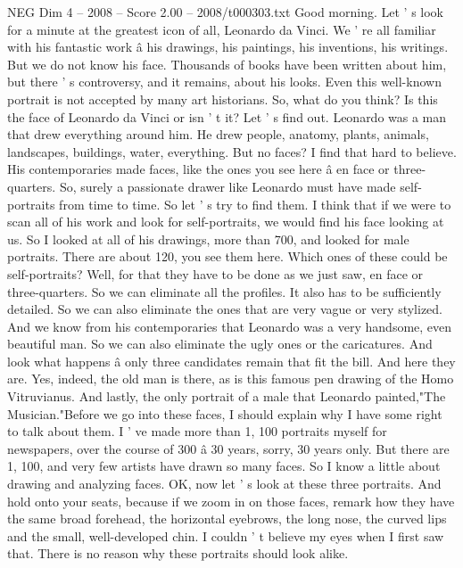 \begin{textsample}{NEG Dim 4 – 2008 – Score 2.00 – 2008/t000303.txt}  \label{ex:f4_neg_029}
Good morning.
Let ' s look for a minute at the greatest icon of all, Leonardo da Vinci.
We ' re all familiar with his fantastic work â his drawings, his paintings, his inventions, his writings.
But we do not know his face.
Thousands of books have been written about him, but there ' s controversy, and it remains, about his looks.
Even this well-known portrait is not accepted by many art historians.
So, what do you think?
Is this the face of Leonardo da Vinci or isn ' t it?
Let ' s find out.
Leonardo was a man that drew everything around him.
He drew people, anatomy, plants, animals, landscapes, buildings, water, everything.
But no faces?
I find that hard to believe.
His contemporaries made faces, like the ones you see here â en face or three-quarters.
So, surely a passionate drawer like Leonardo must have made self-portraits from time to time.
So let ' s try to find them.
I think that if we were to scan all of his work and look for self-portraits, we would find his face looking at us.
So I looked at all of his drawings, more than 700, and looked for male portraits.
There are about 120, you see them here.
Which ones of these could be self-portraits?
Well, for that they have to be done as we just saw, en face or three-quarters.
So we can eliminate all the profiles.
It also has to be sufficiently detailed.
So we can also eliminate the ones that are very vague or very stylized.
And we know from his contemporaries that Leonardo was a very handsome, even beautiful man.
So we can also eliminate the ugly ones or the caricatures.
And look what happens â only three candidates remain that fit the bill.
And here they are.
Yes, indeed, the old man is there, as is this famous pen drawing of the Homo Vitruvianus.
And lastly, the only portrait of a male that Leonardo painted,"The Musician."Before we go into these faces, I should explain why I have some right to talk about them.
I ' ve made more than 1, 100 portraits myself for newspapers, over the course of 300 â 30 years, sorry, 30 years only.
But there are 1, 100, and very few artists have drawn so many faces.
So I know a little about drawing and analyzing faces.
OK, now let ' s look at these three portraits.
And hold onto your seats, because if we zoom in on those faces, remark how they have the same broad forehead, the horizontal eyebrows, the long nose, the curved lips and the small, well-developed chin.
I couldn ' t believe my eyes when I first saw that.
There is no reason why these portraits should look alike.

\end{textsample}
